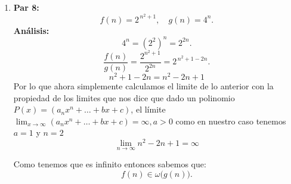 \documentclass[12pt]{article}
\begin{document}
\begin{enumerate}
  \item \textbf{Par 8:}
  \[
    f(n) = 2^{\,n^2 + 1}, \quad g(n) = 4^n.
  \]
  \textbf{Análisis:}
  \[
    4^n = (2^2)^n = 2^{2n}.
  \]
  \[
    \frac{f(n)}{g(n)} = \frac{2^{n^2+1}}{2^{2n}} = 2^{\,n^2 + 1 - 2n}.
  \]
  \[
    n^2 + 1 - 2n = n^2 - 2n + 1
  \]
  Por lo que ahora simplemente calculamos el limite de lo anterior con la propiedad de los limites que nos dice que dado un polinomio \( P(x) = (a_n x^n  + \dots + bx+c) \), el límite  \(\lim_{x \to \infty} (a_n x^n  + \dots + bx+c) = \infty, a>0\) como en nuestro caso tenemos $a=1$ y $n=2$ 
  \[
  \lim_{n \to \infty} n^2 - 2n + 1 = \infty
  \]
  
  Como tenemos que es infinito entonces sabemos que:
  \[
    f(n) \in \omega\bigl(g(n)\bigr).
  \]

\end{enumerate}
\end{document}
